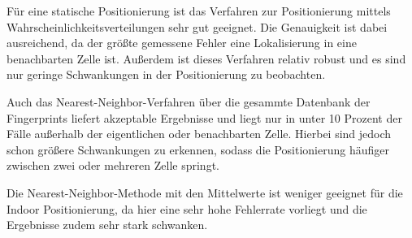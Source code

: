Für eine statische Positionierung ist das Verfahren zur Positionierung mittels Wahrscheinlichkeitsverteilungen sehr gut geeignet. Die Genauigkeit ist dabei ausreichend, da der größte gemessene Fehler eine Lokalisierung in eine benachbarten Zelle ist. Außerdem ist dieses Verfahren relativ robust und es sind nur geringe Schwankungen in der Positionierung zu beobachten.

Auch das Nearest-Neighbor-Verfahren über die gesammte Datenbank der Fingerprints liefert akzeptable Ergebnisse und liegt nur in unter 10 Prozent der Fälle außerhalb der eigentlichen oder benachbarten Zelle. Hierbei sind jedoch schon größere Schwankungen zu erkennen, sodass die Positionierung häufiger zwischen zwei oder mehreren Zelle springt.

Die Nearest-Neighbor-Methode mit den Mittelwerte ist weniger geeignet für die Indoor Positionierung, da hier eine sehr hohe Fehlerrate vorliegt und die Ergebnisse zudem sehr stark schwanken.